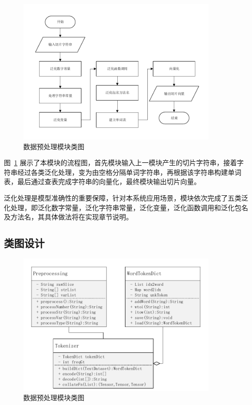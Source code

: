 \begin{figure}[!htb]
    \centering
    \includegraphics[width=0.9\textwidth]{FIGs/chapter3/preProcessing.pdf}
    \caption{数据预处理模块类图}\label{preProcessing}
\end{figure}

图~\ref{preProcessing} 展示了本模块的流程图，首先模块输入上一模块产生的切片字符串，接着字符串经过各类泛化处理，变为由空格分隔单词字符串，再根据该字符串构建单词表，最后通过查表完成字符串的向量化，最终模块输出切片向量。

泛化处理是模型准确性的重要保障，针对本系统应用场景，模块依次完成了五类泛化处理，即泛化数字常量，泛化字符串常量，泛化变量，泛化函数调用和泛化包名及方法名，其具体做法将在实现章节说明。\\

\subsection{类图设计}

\begin{figure}[!htb]
    \centering
    \includegraphics[width=0.9\textwidth]{FIGs/chapter3/preClass.pdf}
    \caption{数据预处理模块类图}\label{preClass}
\end{figure}

